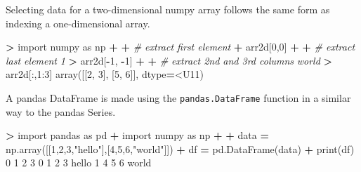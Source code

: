 \documentclass[
]{book}
\newenvironment{Shaded}{\begin{snugshade}}{\end{snugshade}}
\newcommand{\BuiltInTok}[1]{#1}
\newcommand{\CommentTok}[1]{\textcolor[rgb]{0.56,0.35,0.01}{\textit{#1}}}
\newcommand{\DecValTok}[1]{\textcolor[rgb]{0.00,0.00,0.81}{#1}}
\newcommand{\ImportTok}[1]{#1}
\newcommand{\NormalTok}[1]{#1}
\newcommand{\OperatorTok}[1]{\textcolor[rgb]{0.81,0.36,0.00}{\textbf{#1}}}
\newcommand{\StringTok}[1]{\textcolor[rgb]{0.31,0.60,0.02}{#1}}
\begin{document}
Selecting data for a two-dimensional numpy array follows the same form as indexing a one-dimensional array.

\begin{Shaded}
\begin{Highlighting}[]
\OperatorTok{\textgreater{}} \ImportTok{import}\NormalTok{ numpy }\ImportTok{as}\NormalTok{ np}
\OperatorTok{+} 
\OperatorTok{+} \CommentTok{\# extract first element }
\OperatorTok{+}\NormalTok{ arr2d[}\DecValTok{0}\NormalTok{,}\DecValTok{0}\NormalTok{]}
\OperatorTok{+} 
\OperatorTok{+} \CommentTok{\# extract last element }
\CommentTok{\textquotesingle{}1\textquotesingle{}}
\OperatorTok{\textgreater{}}\NormalTok{ arr2d[}\OperatorTok{{-}}\DecValTok{1}\NormalTok{, }\OperatorTok{{-}}\DecValTok{1}\NormalTok{]}
\OperatorTok{+} 
\OperatorTok{+} \CommentTok{\# extract 2nd and 3rd columns}
\CommentTok{\textquotesingle{}world\textquotesingle{}}
\OperatorTok{\textgreater{}}\NormalTok{ arr2d[:,}\DecValTok{1}\NormalTok{:}\DecValTok{3}\NormalTok{]}
\NormalTok{array([[}\StringTok{\textquotesingle{}2\textquotesingle{}}\NormalTok{, }\StringTok{\textquotesingle{}3\textquotesingle{}}\NormalTok{],}
\NormalTok{       [}\StringTok{\textquotesingle{}5\textquotesingle{}}\NormalTok{, }\StringTok{\textquotesingle{}6\textquotesingle{}}\NormalTok{]], dtype}\OperatorTok{=}\StringTok{\textquotesingle{}\textless{}U11\textquotesingle{}}\NormalTok{)}
\end{Highlighting}
\end{Shaded}

A pandas DataFrame is made using the \texttt{pandas.DataFrame} function in a similar way to the pandas Series.

\begin{Shaded}
\begin{Highlighting}[]
\OperatorTok{\textgreater{}} \ImportTok{import}\NormalTok{ pandas }\ImportTok{as}\NormalTok{ pd}
\OperatorTok{+} \ImportTok{import}\NormalTok{ numpy }\ImportTok{as}\NormalTok{ np}
\OperatorTok{+} 
\OperatorTok{+}\NormalTok{ data }\OperatorTok{=}\NormalTok{ np.array([[}\DecValTok{1}\NormalTok{,}\DecValTok{2}\NormalTok{,}\DecValTok{3}\NormalTok{,}\StringTok{"hello"}\NormalTok{],[}\DecValTok{4}\NormalTok{,}\DecValTok{5}\NormalTok{,}\DecValTok{6}\NormalTok{,}\StringTok{"world"}\NormalTok{]])}
\OperatorTok{+}\NormalTok{ df }\OperatorTok{=}\NormalTok{ pd.DataFrame(data)}
\OperatorTok{+} \BuiltInTok{print}\NormalTok{(df)}
   \DecValTok{0}  \DecValTok{1}  \DecValTok{2}      \DecValTok{3}
\DecValTok{0}  \DecValTok{1}  \DecValTok{2}  \DecValTok{3}\NormalTok{  hello}
\DecValTok{1}  \DecValTok{4}  \DecValTok{5}  \DecValTok{6}\NormalTok{  world}
\end{Highlighting}
\end{Shaded}
\end{document}
